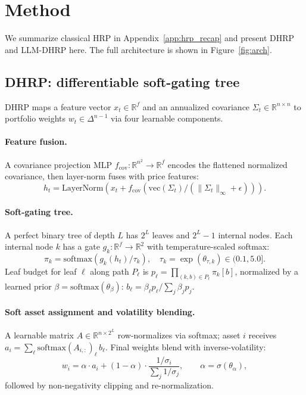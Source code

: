 \section{Method}
\label{sec:method}

We summarize classical HRP in Appendix~\ref{app:hrp_recap} and present
DHRP and LLM-DHRP here. The full architecture is shown in
Figure~\ref{fig:arch}.


\subsection{DHRP: differentiable soft-gating tree}
\label{sec:dhrp_layer}

DHRP maps a feature vector $x_t \in \mathbb{R}^f$ and an annualized
covariance $\Sigma_t \in \mathbb{R}^{n \times n}$ to portfolio weights
$w_t \in \Delta^{n-1}$ via four learnable components.

\paragraph{Feature fusion.}
A covariance projection MLP $f_{\text{cov}}: \mathbb{R}^{n^2} \to \mathbb{R}^f$
encodes the flattened normalized covariance, then layer-norm fuses with
price features:
\begin{equation}
h_t = \mathrm{LayerNorm}\left(x_t + f_{\text{cov}}\!\left(
\mathrm{vec}(\Sigma_t)/(\|\Sigma_t\|_\infty + \epsilon)\right)\right).
\end{equation}

\paragraph{Soft-gating tree.}
A perfect binary tree of depth $L$ has $2^L$ leaves and $2^L-1$ internal
nodes. Each internal node $k$ has a gate $g_k: \mathbb{R}^f \to \mathbb{R}^2$
with temperature-scaled softmax:
\begin{equation}
\pi_k = \mathrm{softmax}(g_k(h_t) / \tau_k),
\quad \tau_k = \exp(\theta_{\tau,k}) \in (0.1, 5.0].
\label{eq:gates}
\end{equation}
Leaf budget for leaf $\ell$ along path $P_\ell$ is
$p_\ell = \prod_{(k, b) \in P_\ell} \pi_k[b]$, normalized by a learned
prior $\beta = \mathrm{softmax}(\theta_\beta)$:
$b_\ell = \beta_\ell p_\ell / \sum_j \beta_j p_j$.

\paragraph{Soft asset assignment and volatility blending.}
A learnable matrix $A \in \mathbb{R}^{n \times 2^L}$ row-normalizes via
softmax; asset $i$ receives $a_i = \sum_\ell \mathrm{softmax}(A_{i,:})_\ell\, b_\ell$.
Final weights blend with inverse-volatility:
\begin{equation}
w_i = \alpha \cdot a_i + (1-\alpha) \cdot \frac{1/\sigma_i}{\sum_j 1/\sigma_j},
\qquad \alpha = \sigma(\theta_\alpha),
\label{eq:blend}
\end{equation}
followed by non-negativity clipping and re-normalization.

